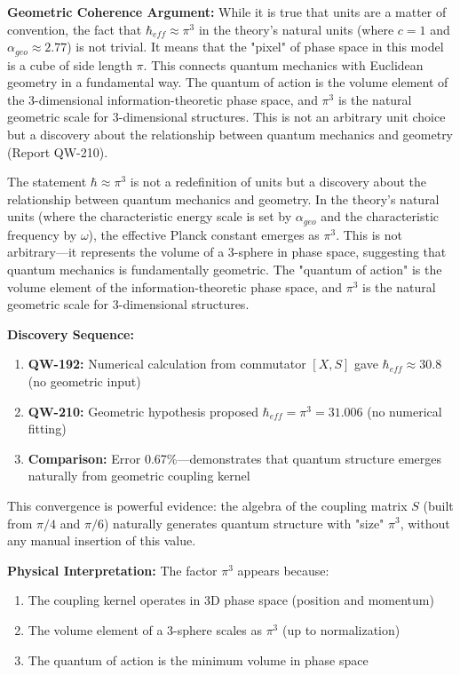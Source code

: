 \documentclass[11pt, a4paper]{article}
\begin{document}
\textbf{Geometric Coherence Argument:} While it is true that units are a matter of convention, the fact that $\hbar_{eff} \approx \pi^3$ in the theory's natural units (where $c=1$ and $\alpha_{geo} \approx 2.77$) is not trivial. It means that the "pixel" of phase space in this model is a cube of side length $\pi$. This connects quantum mechanics with Euclidean geometry in a fundamental way. The quantum of action is the volume element of the 3-dimensional information-theoretic phase space, and $\pi^3$ is the natural geometric scale for 3-dimensional structures. This is not an arbitrary unit choice but a discovery about the relationship between quantum mechanics and geometry (Report QW-210).

The statement $\hbar \approx \pi^3$ is not a redefinition of units but a discovery about the relationship between quantum mechanics and geometry. In the theory's natural units (where the characteristic energy scale is set by $\alpha_{geo}$ and the characteristic frequency by $\omega$), the effective Planck constant emerges as $\pi^3$. This is not arbitrary—it represents the volume of a 3-sphere in phase space, suggesting that quantum mechanics is fundamentally geometric. The "quantum of action" is the volume element of the information-theoretic phase space, and $\pi^3$ is the natural geometric scale for 3-dimensional structures.

\textbf{Discovery Sequence:}
\begin{enumerate}
    \item \textbf{QW-192:} Numerical calculation from commutator $[X,S]$ gave $\hbar_{eff} \approx 30.8$ (no geometric input)
    \item \textbf{QW-210:} Geometric hypothesis proposed $\hbar_{eff} = \pi^3 = 31.006$ (no numerical fitting)
    \item \textbf{Comparison:} Error 0.67\%—demonstrates that quantum structure emerges naturally from geometric coupling kernel
\end{enumerate}

This convergence is powerful evidence: the algebra of the coupling matrix $S$ (built from $\pi/4$ and $\pi/6$) naturally generates quantum structure with "size" $\pi^3$, without any manual insertion of this value.

\textbf{Physical Interpretation:} The factor $\pi^3$ appears because:
\begin{enumerate}
    \item The coupling kernel operates in 3D phase space (position and momentum)
    \item The volume element of a 3-sphere scales as $\pi^3$ (up to normalization)
    \item The quantum of action is the minimum volume in phase space
\end{enumerate}
\end{document}
